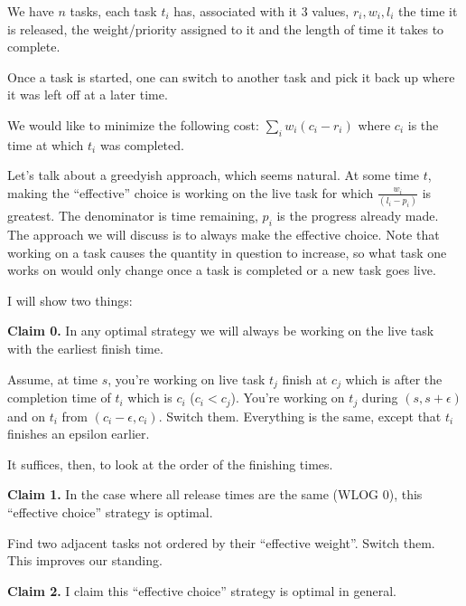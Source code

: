 \documentclass[10pt]{article}
\author{Adam Freilich}
\begin{document}
We have $n$ tasks, each task $t_i$ has, associated with it 3 values, \(r_i, w_i, l_i\) the time it is released, the weight/priority assigned to it and the length of time it takes to complete. 

Once a task is started, one can switch to another task and pick it back up where it was left off at a later time. 

We would like to minimize the following cost: \(\sum_i w_i(c_i - r_i)\) where \(c_i\) is the time at which \(t_i\) was completed. 

Let's talk about a greedyish approach, which seems natural. At some time \(t\), making the ``effective'' choice is working on the live task for which \(\frac{w_i}{(l_i - p_i)}\) is greatest. The denominator is time remaining, \(p_i\) is the progress already made. The approach we will discuss is to always make the effective choice. Note that working on a task causes the quantity in question to increase, so what task one works on would only change once a task is completed or a new task goes live. 

I will show two things:

\textbf{Claim 0.} In any optimal strategy we will always be working on the live task with the earliest finish time. 

Assume, at time \(s\),  you're working on live task \(t_j\) finish at \(c_j\) which is after the completion time of \(t_i\) which is \(c_i\) (\(c_i < c_j\)). You're working on \(t_j\) during \((s, s + \epsilon)\) and on \(t_i\) from \((c_i - \epsilon, c_i)\). Switch them. Everything is the same, except that \(t_i\) finishes an epsilon earlier. 

It suffices, then, to look at the order of the finishing times. 

\textbf{Claim 1.} In the case where all release times are the same (WLOG 0), this ``effective choice'' strategy is optimal. 

Find two adjacent tasks not ordered by their ``effective weight''. Switch them. This improves our standing. 

\textbf{Claim 2.} I claim this ``effective choice'' strategy is optimal in general.

\end{document}
